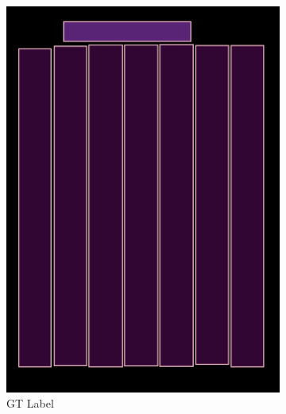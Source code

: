\documentclass[aspectratio=1610]{beamer}
\begin{document}
\begin{frame}
\begin{figure}
\begin{subfigure}{.25\textwidth}
  \includegraphics[width=0.99\linewidth, clip=true, trim = 0mm 0mm 0mm 0mm]{figures/bbox/zk6UnuL.jpg}
  \caption{GT Label}
\end{subfigure}%
\begin{subfigure}{.25\textwidth}
  \centering

\end{subfigure}
\end{figure}
\end{frame}
\end{document}

